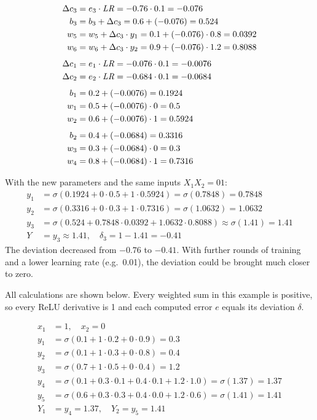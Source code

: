 \begin{align*}
  \Delta c_3 &= e_3 \cdot \mathit{LR} = -0.76 \cdot 0.1 = -0.076 \\
  b_3 &= b_3 + \Delta c_3 = 0.6 + (-0.076) = 0.524 \\
  w_5 &= w_5 + \Delta c_3 \cdot y_1 = 0.1 + (-0.076) \cdot 0.8 = 0.0392 \\
  w_6 &= w_6 + \Delta c_3 \cdot y_2 = 0.9 + (-0.076) \cdot 1.2 = 0.8088 \\[1ex]
  \Delta c_1 &= e_1 \cdot \mathit{LR} = -0.076 \cdot 0.1 = -0.0076 \\
  \Delta c_2 &= e_2 \cdot \mathit{LR} = -0.684 \cdot 0.1 = -0.0684 \\[1ex]
  b_1 &= 0.2 + (-0.0076) = 0.1924 \\
  w_1 &= 0.5 + (-0.0076) \cdot 0 = 0.5 \\
  w_2 &= 0.6 + (-0.0076) \cdot 1 = 0.5924 \\[1ex]
  b_2 &= 0.4 + (-0.0684) = 0.3316 \\
  w_3 &= 0.3 + (-0.0684) \cdot 0 = 0.3 \\
  w_4 &= 0.8 + (-0.0684) \cdot 1 = 0.7316
\end{align*}

With the new parameters and the same inputs $X_1X_2 = 01$:
\begin{align*}
  y_1 &= \sigma(0.1924 + 0 \cdot 0.5 + 1 \cdot 0.5924) = \sigma(0.7848) = 0.7848 \\
  y_2 &= \sigma(0.3316 + 0 \cdot 0.3 + 1 \cdot 0.7316) = \sigma(1.0632) = 1.0632 \\
  y_3 &= \sigma(0.524 + 0.7848 \cdot 0.0392 + 1.0632 \cdot 0.8088) \approx \sigma(1.41) = 1.41 \\
  Y &= y_3 \approx 1.41, \quad \delta_3 = 1 - 1.41 = -0.41
\end{align*}
The deviation decreased from $-0.76$ to $-0.41$. With further rounds of training and a lower
learning rate (e.g.\ 0.01), the deviation could be brought much closer to zero.

All calculations are shown below. Every weighted sum in this example is positive, so every ReLU
derivative is 1 and each computed error $e$ equals its deviation $\delta$.

\begin{align*}
  x_1 &= 1, \quad x_2 = 0 \\
  y_1 &= \sigma(0.1 + 1 \cdot 0.2 + 0 \cdot 0.9) = 0.3 \\
  y_2 &= \sigma(0.1 + 1 \cdot 0.3 + 0 \cdot 0.8) = 0.4 \\
  y_3 &= \sigma(0.7 + 1 \cdot 0.5 + 0 \cdot 0.4) = 1.2 \\
  y_4 &= \sigma(0.1 + 0.3 \cdot 0.1 + 0.4 \cdot 0.1 + 1.2 \cdot 1.0) = \sigma(1.37) = 1.37 \\
  y_5 &= \sigma(0.6 + 0.3 \cdot 0.3 + 0.4 \cdot 0.0 + 1.2 \cdot 0.6) = \sigma(1.41) = 1.41 \\
  Y_1 &= y_4 = 1.37, \quad Y_2 = y_5 = 1.41
\end{align*}

